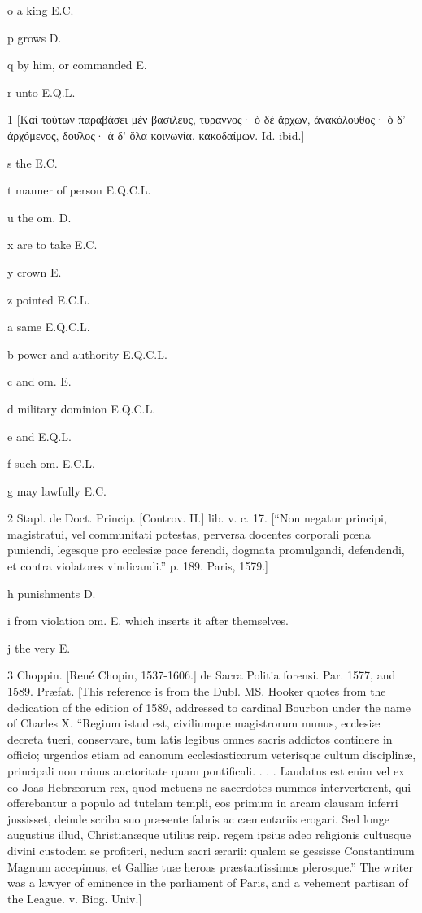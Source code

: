 o
a king E.C.

p
grows D.

q
by him, or commanded E.

r
unto E.Q.L.

1
[Καὶ τούτων παραβάσει μὲν βασιλευς, τύραννος· ὁ δὲ ἄρχων, ἀνακόλουθος· ὁ δ’ ἀρχόμενος, δου̑λος· ἁ δ’ ὅλα κοινωνία, κακοδαίμων. Id. ibid.]

s
the E.C.

t
manner of person E.Q.C.L.

u
the om. D.

x
are to take E.C.

y
crown E.

z
pointed E.C.L.

a
same E.Q.C.L.

b
power and authority E.Q.C.L.

c
and om. E.

d
military dominion E.Q.C.L.

e
and E.Q.L.

f
such om. E.C.L.

g
may lawfully E.C.

2
Stapl. de Doct. Princip. [Controv. II.] lib. v. c. 17. [“Non negatur principi, magistratui, vel communitati potestas, perversa docentes corporali pœna puniendi, legesque pro ecclesiæ pace ferendi, dogmata promulgandi, defendendi, et contra violatores vindicandi.” p. 189. Paris, 1579.]

h
punishments D.

i
from violation om. E. which inserts it after themselves.

j
the very E.

3
Choppin. [René Chopin, 1537-1606.] de Sacra Politia forensi. Par. 1577, and 1589. Præfat. [This reference is from the Dubl. MS. Hooker quotes from the dedication of the edition of 1589, addressed to cardinal Bourbon under the name of Charles X. “Regium istud est, civiliumque magistrorum munus, ecclesiæ decreta tueri, conservare, tum latis legibus omnes sacris addictos continere in officio; urgendos etiam ad canonum ecclesiasticorum veterisque cultum disciplinæ, principali non minus auctoritate quam pontificali. . . . Laudatus est enim vel ex eo Joas Hebræorum rex, quod metuens ne sacerdotes nummos interverterent, qui offerebantur a populo ad tutelam templi, eos primum in arcam clausam inferri jussisset, deinde scriba suo præsente fabris ac cæmentariis erogari. Sed longe augustius illud, Christianæque utilius reip. regem ipsius adeo religionis cultusque divini custodem se profiteri, nedum sacri ærarii: qualem se gessisse Constantinum Magnum accepimus, et Galliæ tuæ heroas præstantissimos plerosque.” The writer was a lawyer of eminence in the parliament of Paris, and a vehement partisan of the League. v. Biog. Univ.]

